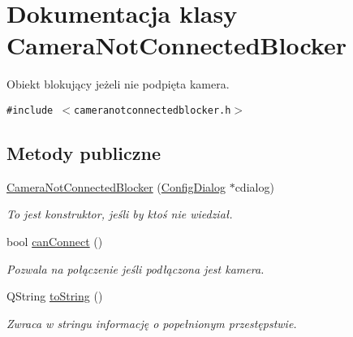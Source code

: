 \hypertarget{class_camera_not_connected_blocker}{
\section{Dokumentacja klasy CameraNotConnectedBlocker}
\label{class_camera_not_connected_blocker}
}
Obiekt blokujący jeżeli nie podpięta kamera.  


{\tt \#include $<$cameranotconnectedblocker.h$>$}

\subsection*{Metody publiczne}
\begin{CompactItemize}
\item 
\hyperlink{class_camera_not_connected_blocker_36847155966f5fded3d9d5ae9a348be7}{CameraNotConnectedBlocker} (\hyperlink{class_config_dialog}{ConfigDialog} $\ast$cdialog)
\begin{CompactList}\small\item\em To jest konstruktor, jeśli by ktoś nie wiedział. \item\end{CompactList}\item 
\hypertarget{class_camera_not_connected_blocker_6a2b84c9469178c7bdc3a40279ba17eb}{
bool \hyperlink{class_camera_not_connected_blocker_6a2b84c9469178c7bdc3a40279ba17eb}{canConnect} ()}
\label{class_camera_not_connected_blocker_6a2b84c9469178c7bdc3a40279ba17eb}

\begin{CompactList}\small\item\em Pozwala na połączenie jeśli podłączona jest kamera. \item\end{CompactList}\item 
\hypertarget{class_camera_not_connected_blocker_dc130d65f47c9e7d2a07d032c3f62ba5}{
QString \hyperlink{class_camera_not_connected_blocker_dc130d65f47c9e7d2a07d032c3f62ba5}{toString} ()}
\label{class_camera_not_connected_blocker_dc130d65f47c9e7d2a07d032c3f62ba5}

\begin{CompactList}\small\item\em Zwraca w stringu informację o popełnionym przestępstwie. \item\end{CompactList}\end{CompactItemize}


